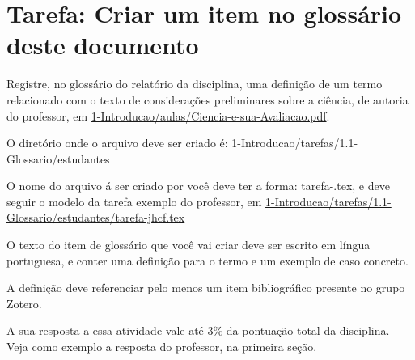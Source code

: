 \section{Tarefa: Criar um item no glossário deste documento \label{tarefa:glossario}}

Registre, no glossário do relatório da disciplina, uma definição de um termo relacionado com o texto de considerações preliminares sobre a ciência, de autoria do professor, em  \url{1-Introducao/aulas/Ciencia-e-sua-Avaliacao.pdf}.

O diretório onde o arquivo deve ser criado é: 
1-Introducao/tarefas/1.1-Glossario/estudantes

O nome do arquivo á ser criado por você deve ter a forma:
tarefa-\githubusername.tex, e deve seguir o modelo da tarefa exemplo do professor, em
\url{1-Introducao/tarefas/1.1-Glossario/estudantes/tarefa-jhcf.tex}

O texto do item de glossário que você vai criar deve ser escrito em língua portuguesa, e conter uma definição para o termo e um exemplo de caso concreto.

A definição deve referenciar pelo menos um item bibliográfico presente no grupo Zotero.

A sua resposta a essa atividade vale até 3\% da pontuação total da disciplina.
Veja como exemplo a resposta do professor, na primeira seção.


